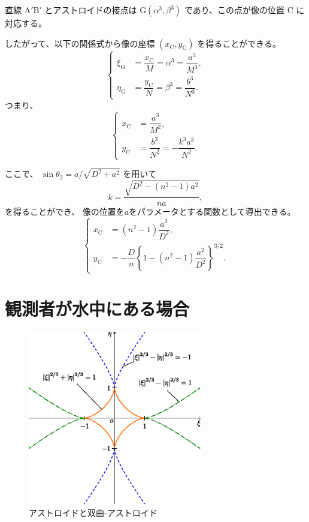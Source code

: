 \documentclass[twocolumn]{article}
\begin{document}
直線 ${\mathrm{A'B'}}$ とアストロイドの接点は $\mathrm{G}(\alpha^3, \beta^3)$ であり、この点が像の位置 $\mathrm{C}$ に対応する。
	
したがって、以下の関係式から像の座標 $(x_{\mathrm{C}}^{}, y_{\mathrm{C}}^{})$ を得ることができる。
$$ \left\{ 
\begin{aligned}
	\xi_{\mathrm{G}}^{} &= \dfrac{x_{\mathrm{C}}^{}}{M} = \alpha^3 = \dfrac{a^3}{M^3},\\
	\eta_{\mathrm{G}}^{} &= \dfrac{y_{\mathrm{C}}^{}}{N} = \beta^3 = \dfrac{b^3}{N^3}.
\end{aligned}
\right.$$
つまり、
$$ \left\{ 
\begin{aligned}
	x_{\mathrm{C}}^{} &= \dfrac{a^3}{M^2},\\
	y_{\mathrm{C}}^{} &= \dfrac{b^3}{N^2}=-\dfrac{k^3a^3}{N^2}.
\end{aligned}
\right.$$

ここで、
$\sin\theta_2 = {a}/{\sqrt{D^2+a^2}}$
を用いて
$$k = \dfrac{\sqrt{D^2-(n^2-1)a^2}}{na},$$
を得ることができ、
像の位置を$a$をパラメータとする関数として導出できる。
$$ \left\{ 
\begin{aligned}
	x_{\mathrm{C}}^{} &= (n^2-1)\dfrac{a^3}{D^2},\\
	y_{\mathrm{C}}^{}
	&= -\dfrac{D}{n}\left\{ 1-(n^2-1)\dfrac{a^2}{D^2} \right\}^{3/2}.
\end{aligned}
\right.$$
	
\section{観測者が水中にある場合}

\begin{figure}
	\centering
	\includegraphics[width=3in]{figs/g254.eps}
	\caption{アストロイドと双曲-アストロイド}
	\label{fig:hyperastroid}
\end{figure}
\end{document}
